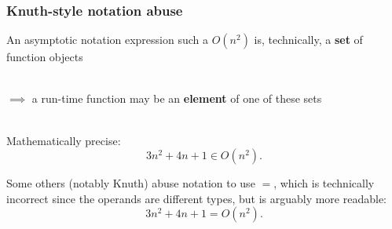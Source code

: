 \documentclass{beamer}
\newcommand{\stanza}{ \\~\ }
\begin{document}
\begin{frame} \frametitle{Knuth-style notation abuse}

  An asymptotic notation expression such a $O(n^2)$ is, technically, a
  \textbf{set} of function objects \stanza

  $\implies$ a run-time function may be an \textbf{element} of one of these sets \stanza

  Mathematically precise: \[ 3n^2+4n+1 \in O(n^2). \]

  Some others (notably Knuth) abuse notation to use $=$, which is technically incorrect
  since the operands are different types, but is arguably more readable:
  \[ 3n^2 + 4n +1 = O(n^2) .\]

\end{frame}
\end{document}
